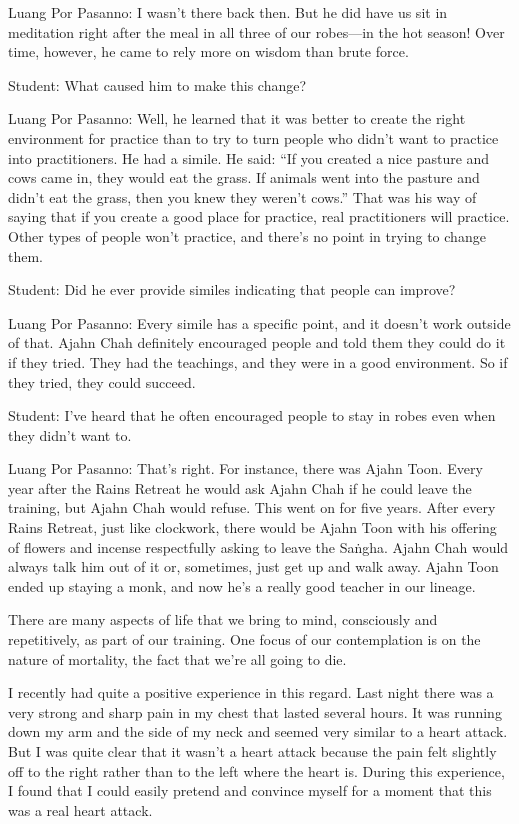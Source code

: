 Luang Por Pasanno: I wasn't there back then. But he did have us sit in 
meditation right after the meal in all three of our robes---in the hot 
season! Over time, however, he came to rely more on wisdom than brute 
force.

Student: What caused him to make this change?

Luang Por Pasanno: Well, he learned that it was better to create the 
right environment for practice than to try to turn people who didn't 
want to practice into practitioners. He had a simile. He said: ``If you 
created a nice pasture and cows came in, they would eat the grass. If 
animals went into the pasture and didn't eat the grass, then you knew 
they weren't cows.'' That was his way of saying that if you create a 
good place for practice, real practitioners will practice. Other types 
of people won't practice, and there's no point in trying to change them.

Student: Did he ever provide similes indicating that people can improve?

Luang Por Pasanno: Every simile has a specific point, and it doesn't 
work outside of that. Ajahn Chah definitely encouraged people and told 
them they could do it if they tried. They had the teachings, and they 
were in a good environment. So if they tried, they could succeed.

Student: I've heard that he often encouraged people to stay in robes 
even when they didn't want to.

Luang Por Pasanno: That's right. For instance, there was Ajahn Toon. 
Every year after the Rains Retreat he would ask Ajahn Chah if he could 
leave the training, but Ajahn Chah would refuse. This went on for five 
years. After every Rains Retreat, just like clockwork, there would be 
Ajahn Toon with his offering of flowers and incense respectfully asking 
to leave the Saṅgha. Ajahn Chah would always talk him out of it or, 
sometimes, just get up and walk away. Ajahn Toon ended up staying a 
monk, and now he's a really good teacher in our lineage.


There are many aspects of life that we bring to mind, consciously and 
repetitively, as part of our training. One focus of our contemplation 
is on the nature of mortality, the fact that we're all going to die.

I recently had quite a positive experience in this regard. Last night 
there was a very strong and sharp pain in my chest that lasted several 
hours. It was running down my arm and the side of my neck and seemed 
very similar to a heart attack. But I was quite clear that it wasn't a 
heart attack because the pain felt slightly off to the right rather 
than to the left where the heart is. During this experience, I found 
that I could easily pretend and convince myself for a moment that this 
was a real heart attack.

